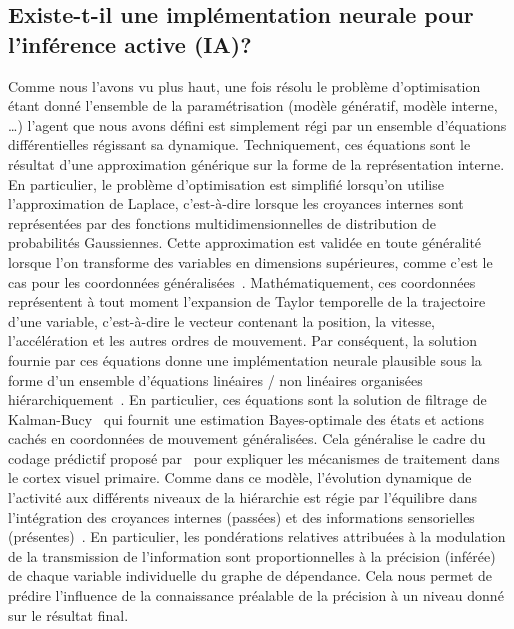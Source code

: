 \subsection{Existe-t-il une implémentation neurale pour l'inférence
active (IA)?}
Comme nous l'avons vu plus haut, une fois résolu le problème
d'optimisation étant donné l'ensemble de la paramétrisation (modèle génératif, modèle interne,
\ldots) l'agent que nous avons défini est simplement régi par un
ensemble d'équations différentielles régissant sa dynamique.
Techniquement, ces équations sont le résultat d'une approximation
générique sur la forme de la représentation interne. En particulier, le
problème d'optimisation est simplifié lorsqu'on utilise l'approximation
de Laplace, c'est-à-dire lorsque les croyances internes sont
représentées par des fonctions multidimensionnelles de distribution de
probabilités Gaussiennes. Cette approximation est validée en toute généralité lorsque
l'on transforme des variables en dimensions supérieures, comme c'est le
cas pour les coordonnées généralisées~\citep{Friston10generalized}.
Mathématiquement, ces
coordonnées représentent à tout moment l'expansion de Taylor temporelle de la
trajectoire d'une variable, c'est-à-dire le vecteur contenant
la position, la vitesse, l'accélération et les autres ordres de
mouvement. Par conséquent, la solution fournie par ces équations donne
une implémentation neurale plausible sous la forme d'un ensemble
d'équations linéaires / non linéaires organisées hiérarchiquement~\citep{Heeger17}. En particulier, ces équations sont la solution de
filtrage de Kalman-Bucy~\citep{Kalman60} qui fournit une estimation
Bayes-optimale des états et actions cachés en coordonnées de mouvement
généralisées. Cela généralise le cadre du codage prédictif proposé par~\citet{Rao99}
 pour expliquer les mécanismes de traitement dans
le cortex visuel primaire. Comme dans ce modèle, l'évolution dynamique
de l'activité aux différents niveaux de la hiérarchie est régie par
l'équilibre dans l'intégration des croyances internes (passées) et des
informations sensorielles (présentes)~\citep{Heeger17}. En particulier, les
pondérations relatives attribuées à la modulation de la transmission de
l'information sont proportionnelles à la précision (inférée) de chaque
variable individuelle du graphe de dépendance. Cela nous permet de
prédire l'influence de la connaissance préalable de la précision à un
niveau donné sur le résultat final.

